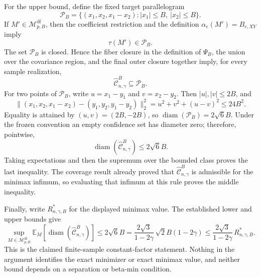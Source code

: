 For the upper bound, define the fixed target parallelogram
\[
\mathcal P_B
=\{(x_1,x_2,x_1-x_2): |x_1|\le B,\ |x_2|\le B\}.
\]
If \(M'\in\mathcal M_{p,B}^{\mathrm{df}}\), then the coefficient restriction and the definition \(\alpha_e(M')=B_{e,XY}\) imply
\[
\tau(M')\in\mathcal P_B.
\]
The set \(\mathcal P_B\) is closed.  Hence the fiber closure in the definition of \(\Psi_B\), the union over the covariance region, and the final outer closure together imply, for every sample realization,
\[
\widehat{\mathcal C}^{B}_{n,\gamma}\subseteq\mathcal P_B.
\]
For two points of \(\mathcal P_B\), write \(u=x_1-y_1\) and \(v=x_2-y_2\).  Then \(|u|,|v|\le2B\), and
\[
\|(x_1,x_2,x_1-x_2)-(y_1,y_2,y_1-y_2)\|_2^2
=u^2+v^2+(u-v)^2
\le24B^2.
\]
Equality is attained by \((u,v)=(2B,-2B)\), so \(\operatorname{diam}(\mathcal P_B)=2\sqrt6B\).  Under the frozen convention an empty confidence set has diameter zero; therefore, pointwise,
\[
\operatorname{diam}(\widehat{\mathcal C}^{B}_{n,\gamma})
\le2\sqrt6B.
\]
Taking expectations and then the supremum over the bounded class proves the last inequality.  The coverage result already proved that \(\widehat{\mathcal C}^{B}_{n,\gamma}\) is admissible for the minimax infimum, so evaluating that infimum at this rule proves the middle inequality.

Finally, write \(R^*_{n,\gamma,B}\) for the displayed minimax value.  The established lower and upper bounds give
\[
\sup_{M\in\mathcal M_{p,B}^{\mathrm{df}}}
\mathbb E_M[\operatorname{diam}(\widehat{\mathcal C}^{B}_{n,\gamma})]
\le2\sqrt6B
=\frac{2\sqrt3}{1-2\gamma}\,
  \sqrt2B(1-2\gamma)
\le\frac{2\sqrt3}{1-2\gamma}\,R^*_{n,\gamma,B}.
\]
This is the claimed finite-sample constant-factor statement.  Nothing in the argument identifies the exact minimizer or exact minimax value, and neither bound depends on a separation or beta-min condition.